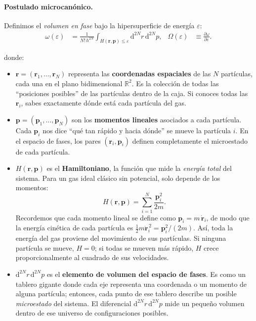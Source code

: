 \documentclass{article}
\begin{document}
\paragraph{Postulado microcanónico.}
Definimos el \emph{volumen en fase} bajo la hipersuperficie de energía \(\varepsilon\):
\begin{align}
\omega(\varepsilon)&=\frac{1}{N!\,h^{2N}}\!\!\int_{H(\mathbf r,\mathbf p)\le \varepsilon}\!\!\mathrm d^{2N}r\,\mathrm d^{2N}p,
&
\Omega(\varepsilon)&\equiv \frac{\partial \omega}{\partial \varepsilon}. \nonumber
\end{align}

\noindent
donde:
\begin{itemize}
  \item \(\mathbf{r}=(\mathbf{r}_1,\ldots,\mathbf{r}_N)\) representa las \textbf{coordenadas espaciales} de las \(N\) partículas, cada una en el plano bidimensional \(\mathbb{R}^2\).  
 Es la colección de todas las “posiciones posibles” de las partículas dentro de la caja.  
  Si conoces todas las \(\mathbf{r}_i\), sabes exactamente dónde está cada partícula del gas.

  \item \(\mathbf{p}=(\mathbf{p}_1,\ldots,\mathbf{p}_N)\) son los \textbf{momentos lineales} asociados a cada partícula.  
  Cada \(\mathbf{p}_i\) nos dice “qué tan rápido y hacia dónde” se mueve la partícula \(i\).  
  En el espacio de fases, los pares \((\mathbf{r}_i,\mathbf{p}_i)\) definen completamente el microestado de cada partícula.

  \item \(H(\mathbf r,\mathbf p)\) es el \textbf{Hamiltoniano}, la función que mide la \emph{energía total} del sistema.  
  Para un gas ideal clásico sin potencial, solo depende de los momentos:
  \[
  H(\mathbf r,\mathbf p)=\sum_{i=1}^{N}\frac{\mathbf p_i^{2}}{2m}.
  \]
  Recordemos que cada momento lineal se define como \(\mathbf{p}_i = m\,\dot{\mathbf{r}}_i\),  
  de modo que la energía cinética de cada partícula es \(\tfrac{1}{2}m\dot{\mathbf{r}}_i^{\,2} = \mathbf{p}_i^{2}/(2m)\).  
  Así, toda la energía del gas proviene del movimiento de sus partículas.  
  Si ninguna partícula se mueve, \(H=0\); si todas se mueven más rápido, \(H\) crece proporcionalmente al cuadrado de sus velocidades.

  \item \(\mathrm d^{2N}r\,\mathrm d^{2N}p\) es el \textbf{elemento de volumen del espacio de fases}.  
  Es como un tablero gigante donde cada eje representa una coordenada o un momento de alguna partícula; entonces, cada punto de ese tablero describe un posible \emph{microestado} del sistema.  
  El diferencial \(\mathrm d^{2N}r\,\mathrm d^{2N}p\) mide un pequeño volumen dentro de ese universo de configuraciones posibles.


\end{itemize}
\end{document}
